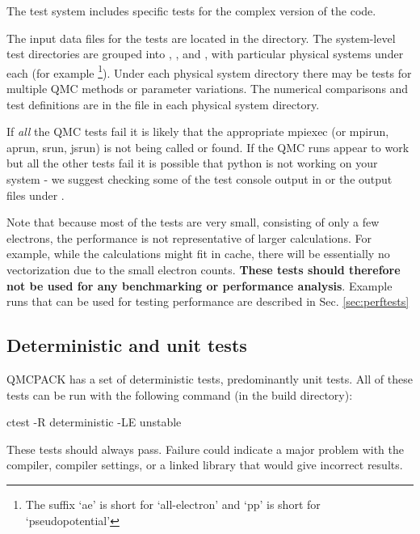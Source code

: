 The test system includes specific tests for the complex version of the code.

The input data files for the tests are located in the  directory.
The system-level test directories are grouped into , , and , with particular physical systems under each (for example 
\footnote{The suffix `ae' is short for `all-electron' and `pp' is short for `pseudopotential'}).
Under each physical system directory there may be tests for multiple QMC methods or parameter variations.
The numerical comparisons and test definitions are in the  file in each physical system directory.

If \textit{all} the QMC tests fail it is likely
that the appropriate mpiexec (or mpirun, aprun, srun, jsrun) is not being
called or found. If the QMC runs appear to work but all the other
tests fail it is possible that python is not working on your system -
we suggest checking some of the test console output in 
or the output files under .


Note that because most of the tests are very small, consisting of only a few
electrons, the performance is not representative of larger
calculations. For example, while the calculations might fit in cache,
there will be essentially no vectorization due to the small electron
counts. \textbf{These tests should therefore not be used for any benchmarking or
performance analysis}. Example runs that can be used for testing performance are described in
Sec. \ref{sec:perftests}

\subsection{Deterministic and unit tests}

QMCPACK has a set of deterministic tests, predominantly unit tests.
All of these tests can be run with the following command (in the build directory):

\begin{shade}
ctest -R deterministic -LE unstable
\end{shade}

These tests should always pass. Failure could indicate a major problem
with the compiler, compiler settings, or a linked library that would
give incorrect results.

